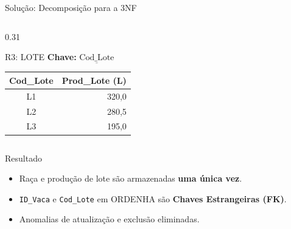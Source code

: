 \documentclass[9pt]{beamer}
\begin{document}
\begin{frame}{Solução: Decomposição para a 3NF}
\begin{columns}[t]
    \begin{column}{0.31\textwidth}
        \begin{exampleblock}{\small R3: LOTE}
        \textbf{Chave:} $\underline{\text{Cod\_Lote}}$
        \vspace{0.1cm}

        \tiny
        \centering
        \begin{tabular}{|c|r|}
        \hline
        \textbf{Cod\_Lote} & \textbf{Prod\_Lote (L)} \\ \hline
        L1 & 320,0 \\ \hline
        L2 & 280,5 \\ \hline
        L3 & 195,0 \\ \hline
        \end{tabular}
        \end{exampleblock}
    \end{column}
\end{columns}

\vspace{0.3cm}
\begin{block}{Resultado}
\begin{itemize}
  \item Raça e produção de lote são armazenadas \textbf{uma única vez}.
  \item \texttt{ID\_Vaca} e \texttt{Cod\_Lote} em ORDENHA são \textbf{Chaves Estrangeiras (FK)}.
  \item Anomalias de atualização e exclusão eliminadas.
\end{itemize}
\end{block}
\end{frame}
\end{document}
